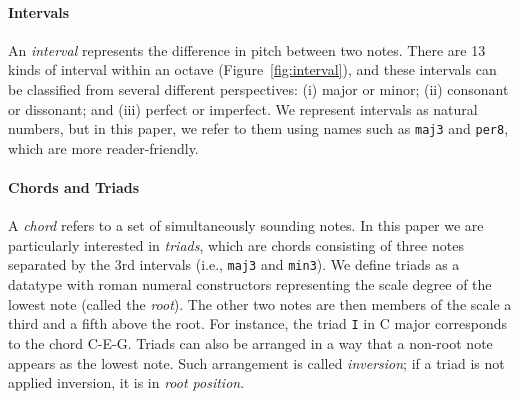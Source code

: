 


\paragraph{Intervals}

\Interval

An \emph{interval} represents the difference in pitch between
two notes.
There are 13 kinds of interval within an octave
(Figure~\ref{fig:interval}), and these intervals can be classified from
several different perspectives:
(i) major or minor; (ii) consonant or dissonant; and (iii) perfect
or imperfect.
We represent intervals as natural numbers, but in this paper, we
refer to them using names such as \texttt{maj3} and \texttt{per8},
which are more reader-friendly.

\paragraph{Chords and Triads}

A \emph{chord} refers to a set of simultaneously sounding notes.
In this paper we are particularly interested in \emph{triads}, which are
chords consisting of three notes separated by the 3rd intervals (i.e.,
\texttt{maj3} and \texttt{min3}).
We define triads as a datatype with roman numeral constructors
representing the scale degree of the lowest note (called the \emph{root}).
The other two notes are then members of the scale a third and a fifth
above the root.
For instance, the triad \texttt{I} in C major corresponds to the chord
C-E-G.
Triads can also be arranged in a way that a non-root note appears as
the lowest note.
Such arrangement is called \emph{inversion}; if a triad is not applied
inversion, it is in \emph{root position}.
